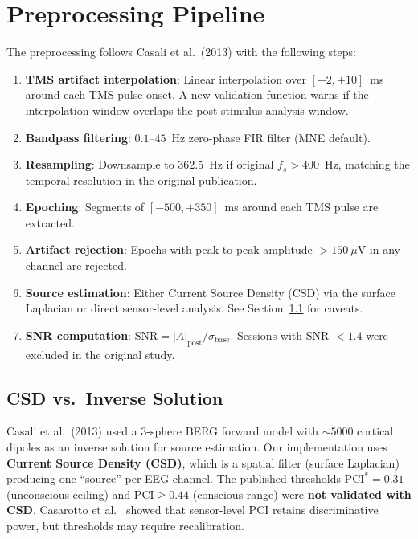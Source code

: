 \documentclass[11pt,a4paper]{article}
\begin{document}
\section{Preprocessing Pipeline}
\label{sec:preproc}

The preprocessing follows Casali et al.\ (2013) with the following steps:

\begin{enumerate}[leftmargin=2em]
  \item \textbf{TMS artifact interpolation}: Linear interpolation over $[-2, +10]$~ms around
        each TMS pulse onset. A new validation function warns if the interpolation window
        overlaps the post-stimulus analysis window.

  \item \textbf{Bandpass filtering}: $0.1$--$45$~Hz zero-phase FIR filter (MNE default).

  \item \textbf{Resampling}: Downsample to $362.5$~Hz if original $f_s > 400$~Hz, matching
        the temporal resolution in the original publication.

  \item \textbf{Epoching}: Segments of $[-500, +350]$~ms around each TMS pulse are extracted.

  \item \textbf{Artifact rejection}: Epochs with peak-to-peak amplitude $> 150~\mu$V in any
        channel are rejected.

  \item \textbf{Source estimation}: Either Current Source Density (CSD) via the surface
        Laplacian or direct sensor-level analysis. See Section~\ref{sec:csd} for caveats.

  \item \textbf{SNR computation}: $\mathrm{SNR} = \bar{|A|}_{\text{post}} / \bar{\sigma}_{\text{base}}$.
        Sessions with SNR $< 1.4$ were excluded in the original study.
\end{enumerate}

\subsection{CSD vs.\ Inverse Solution}
\label{sec:csd}

\begin{tcolorbox}[title={Important Caveat}, colback=orange!5, colframe=cOrange!70]
Casali et al.\ (2013) used a 3-sphere BERG forward model with ${\sim}5000$ cortical dipoles
as an inverse solution for source estimation. Our implementation uses \textbf{Current Source
Density (CSD)}, which is a spatial filter (surface Laplacian) producing one ``source'' per
EEG channel. The published thresholds $\mathrm{PCI}^* = 0.31$ (unconscious ceiling) and
$\mathrm{PCI} \geq 0.44$ (conscious range) were \textbf{not validated with CSD}.
Casarotto et al.\ \cite{casarotto2016} showed that sensor-level PCI retains discriminative
power, but thresholds may require recalibration.
\end{tcolorbox}
\end{document}

